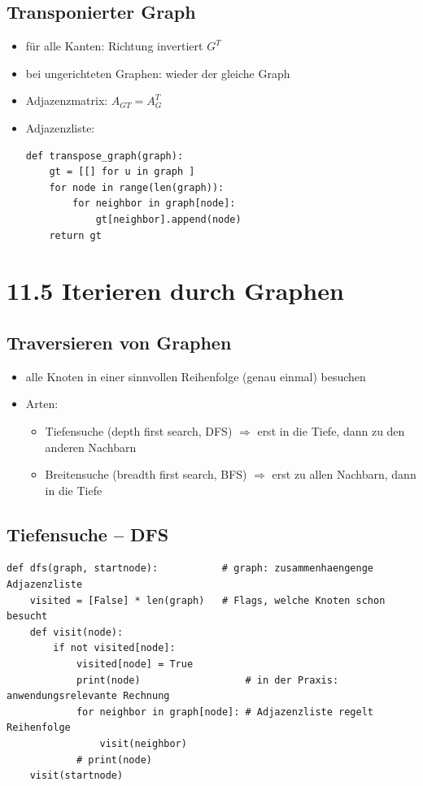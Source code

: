     \subsection*{Transponierter Graph}
    \begin{itemize}
        \item für alle Kanten: Richtung invertiert \hspace*{1cm} $G^T$
        \item bei ungerichteten Graphen: wieder der gleiche Graph
        \item Adjazenzmatrix: $A_{GT} = A_G^T$
        \item Adjazenzliste:
        \begin{verbatim}
def transpose_graph(graph):
    gt = [[] for u in graph ]
    for node in range(len(graph)):
        for neighbor in graph[node]:
            gt[neighbor].append(node)
    return gt
        \end{verbatim}
    \end{itemize}

    \section*{11.5 Iterieren durch Graphen}
    \subsection*{Traversieren von Graphen}
    \begin{itemize}
        \item alle Knoten in einer sinnvollen Reihenfolge (genau einmal) besuchen
        \item Arten:
        \begin{itemize}
            \item Tiefensuche (depth first search, DFS) $\Rightarrow$ erst in die Tiefe, dann zu den anderen Nachbarn
            \item Breitensuche (breadth first search, BFS) $\Rightarrow$ erst zu allen Nachbarn, dann in die Tiefe
        \end{itemize}
    \end{itemize}

    \subsection*{Tiefensuche – DFS}
    \begin{verbatim}
def dfs(graph, startnode):           # graph: zusammenhaengenge Adjazenzliste
    visited = [False] * len(graph)   # Flags, welche Knoten schon besucht
    def visit(node):
        if not visited[node]:
            visited[node] = True
            print(node)                  # in der Praxis: anwendungsrelevante Rechnung
            for neighbor in graph[node]: # Adjazenzliste regelt Reihenfolge
                visit(neighbor)
            # print(node)
    visit(startnode)
    \end{verbatim}

